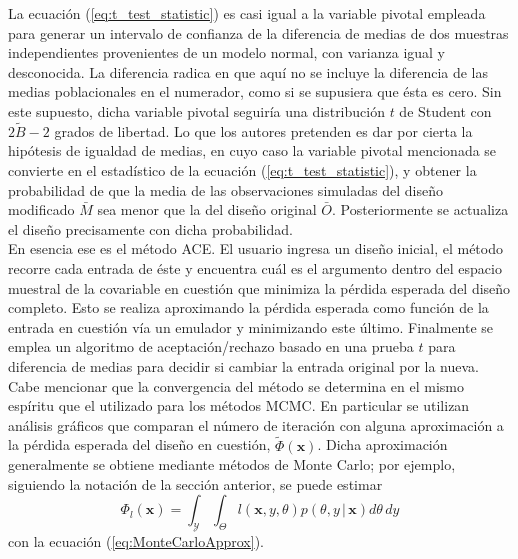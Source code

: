 La ecuación (\ref{eq:t_test_statistic}) es casi igual a la variable pivotal empleada para generar un intervalo de confianza de la diferencia de medias de dos muestras independientes provenientes de un modelo normal, con varianza igual y desconocida. La diferencia radica en que aquí no se incluye la diferencia de las medias poblacionales en el numerador, como si se supusiera que ésta es cero. Sin este supuesto, dicha variable pivotal seguiría una distribución $t$ de Student con $2\tilde{B}-2$ grados de libertad. Lo que los autores pretenden es dar por cierta la hipótesis de igualdad de medias, en cuyo caso la variable pivotal mencionada se convierte en el estadístico de la ecuación (\ref{eq:t_test_statistic}), y obtener la probabilidad de que la media de las observaciones simuladas del diseño modificado $\bar{M}$ sea menor que la del diseño original $\bar{O}$. Posteriormente se actualiza el diseño precisamente con dicha probabilidad. \\




En esencia ese es el método ACE. El usuario ingresa un diseño inicial, el método recorre cada entrada de éste y encuentra cuál es el argumento dentro del espacio muestral de la covariable en cuestión que minimiza la pérdida esperada del diseño completo. Esto se realiza aproximando la pérdida esperada como función de la entrada en cuestión vía un emulador y minimizando este último. Finalmente se emplea un algoritmo de aceptación/rechazo basado en una prueba $t$ para diferencia de medias para decidir si cambiar la entrada original por la nueva. \\





Cabe mencionar que la convergencia del método se determina en el mismo espíritu que el utilizado para los métodos MCMC. En particular se utilizan análisis gráficos que comparan el número de iteración con alguna aproximación a la pérdida esperada del diseño en cuestión, $\tilde{\Phi}(\mathbf{x})$. Dicha aproximación generalmente se obtiene mediante métodos de Monte Carlo; por ejemplo, siguiendo la notación de la sección anterior, se puede estimar
\begin{equation*}
	\Phi_l(\mathbf{x}) = \int_{\mathcal{Y}} \int_{\Theta} l(\mathbf{x}, y, \theta) p( \theta, y \, | \, \mathbf{x}) d\theta \, dy
\end{equation*}
con la ecuación (\ref{eq:MonteCarloApprox}). \\




